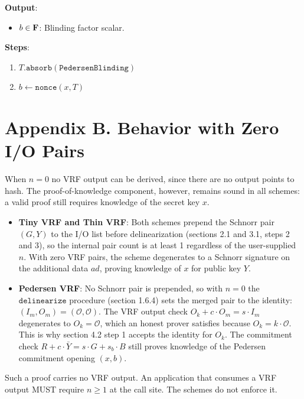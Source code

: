 \documentclass[
]{article}
\providecommand{\tightlist}{%
  \setlength{\itemsep}{0pt}\setlength{\parskip}{0pt}}
\begin{document}
\textbf{Output}:

\begin{itemize}
\tightlist
\item
  \(b \in \bold{F}\): Blinding factor scalar.
\end{itemize}

\textbf{Steps}:

\begin{enumerate}
\def\labelenumi{\arabic{enumi}.}
\tightlist
\item
  \(T.\texttt{absorb}(\texttt{PedersenBlinding})\)
\item
  \(b \gets \texttt{nonce}(x, T)\)
\end{enumerate}

\section{Appendix B. Behavior with Zero I/O
Pairs}\label{appendix-b.-behavior-with-zero-io-pairs}

When \(n = 0\) no VRF output can be derived, since there are no output
points to hash. The proof-of-knowledge component, however, remains sound
in all schemes: a valid proof still requires knowledge of the secret key
\(x\).

\begin{itemize}
\item
  \textbf{Tiny VRF and Thin VRF}: Both schemes prepend the Schnorr pair
  \((G, Y)\) to the I/O list before delinearization (sections 2.1 and
  3.1, steps 2 and 3), so the internal pair count is at least 1
  regardless of the user-supplied \(n\). With zero VRF pairs, the scheme
  degenerates to a Schnorr signature on the additional data \(ad\),
  proving knowledge of \(x\) for public key \(Y\).
\item
  \textbf{Pedersen VRF}: No Schnorr pair is prepended, so with \(n = 0\)
  the \(\texttt{delinearize}\) procedure (section 1.6.4) sets the merged
  pair to the identity: \((I_m, O_m) = (\mathcal{O}, \mathcal{O})\). The
  VRF output check \(O_k + c \cdot O_m = s \cdot I_m\) degenerates to
  \(O_k = \mathcal{O}\), which an honest prover satisfies because
  \(O_k = k \cdot \mathcal{O}\). This is why section 4.2 step 1 accepts
  the identity for \(O_k\). The commitment check
  \(R + c \cdot \bar{Y} = s \cdot G + s_b \cdot B\) still proves
  knowledge of the Pedersen commitment opening \((x, b)\).
\end{itemize}

Such a proof carries no VRF output. An application that consumes a VRF
output MUST require \(n \geq 1\) at the call site. The schemes do not
enforce it.
\end{document}
